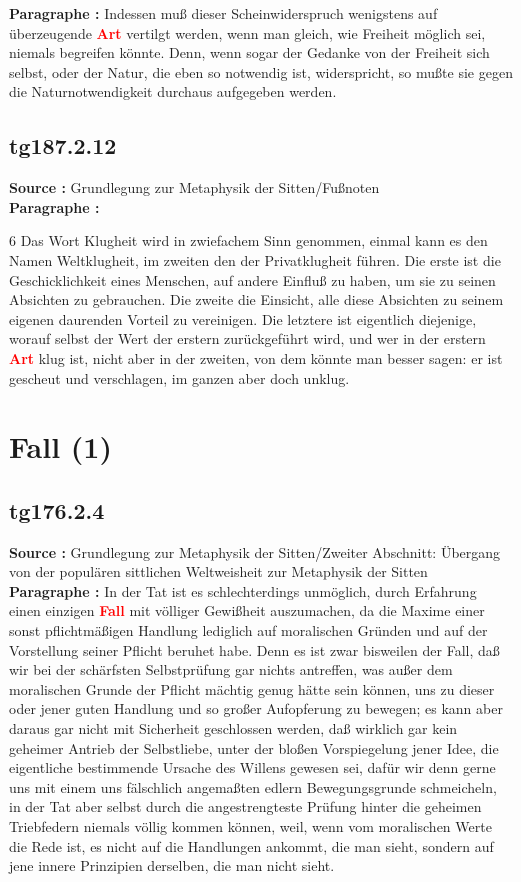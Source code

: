 \documentclass[a4paper,12pt,twoside]{book}
\newcommand{\match}[1]{\textcolor{red}{\textbf{#1}}}
\newcommand{\unnumberedsection}[1]{
	\section*{#1}
	\addcontentsline{toc}{section}{#1}
	\markright{#1}
}
\begin{document}
	\noindent\textbf{Paragraphe : }Indessen muß dieser Scheinwiderspruch wenigstens auf überzeugende \match{Art} vertilgt werden, wenn man gleich, wie Freiheit möglich sei, niemals begreifen könnte. Denn, wenn sogar der Gedanke von der Freiheit sich selbst, oder der  Natur, die eben so notwendig ist, widerspricht, so mußte sie gegen die Naturnotwendigkeit durchaus aufgegeben werden. 
	
	\subsection*{tg187.2.12} 
	\textbf{Source : }Grundlegung zur Metaphysik der Sitten/Fußnoten\\  
	
	\noindent\textbf{Paragraphe : }
	
	6 Das Wort Klugheit wird in zwiefachem Sinn genommen, einmal kann es den Namen Weltklugheit, im zweiten den der Privatklugheit führen. Die erste ist die Geschicklichkeit eines Menschen, auf andere Einfluß zu haben, um sie zu seinen Absichten zu gebrauchen. Die zweite die Einsicht, alle diese Absichten zu seinem eigenen daurenden Vorteil zu vereinigen. Die letztere ist eigentlich diejenige, worauf selbst der Wert der erstern zurückgeführt wird, und wer in der erstern \match{Art} klug ist, nicht aber in der zweiten, von dem könnte man besser sagen: er ist gescheut und verschlagen, im ganzen aber doch unklug. 
	
	\unnumberedsection{Fall (1)} 
	\subsection*{tg176.2.4} 
	\textbf{Source : }Grundlegung zur Metaphysik der Sitten/Zweiter Abschnitt: Übergang von der populären sittlichen Weltweisheit zur Metaphysik der Sitten\\  
	
	\noindent\textbf{Paragraphe : }In der Tat ist es schlechterdings unmöglich, durch Erfahrung einen einzigen \match{Fall} mit völliger Gewißheit auszumachen, da die Maxime einer sonst pflichtmäßigen Handlung lediglich auf moralischen Gründen und auf der Vorstellung seiner Pflicht beruhet habe. Denn es ist zwar bisweilen der Fall, daß wir bei der schärfsten Selbstprüfung gar nichts antreffen, was außer dem moralischen Grunde der Pflicht mächtig genug hätte sein können, uns zu dieser oder jener guten Handlung und so großer Aufopferung zu bewegen; es kann aber daraus gar nicht mit Sicherheit geschlossen werden, daß wirklich gar kein geheimer Antrieb der Selbstliebe, unter der bloßen Vorspiegelung jener Idee, die eigentliche bestimmende Ursache des Willens gewesen sei, dafür wir denn gerne uns mit einem uns fälschlich angemaßten edlern Bewegungsgrunde schmeicheln, in der Tat aber selbst durch die angestrengteste Prüfung hinter die geheimen Triebfedern niemals völlig kommen können, weil, wenn vom moralischen Werte die Rede ist, es nicht auf die Handlungen ankommt, die man sieht, sondern auf jene innere Prinzipien derselben, die man nicht sieht. 
	
\end{document}
